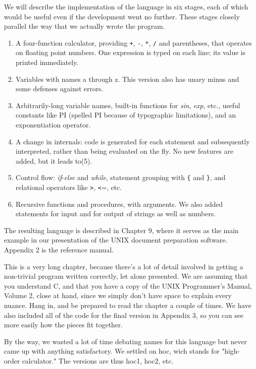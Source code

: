 We will describe the implementation of the language in six stages, each of which
would be useful even if the development went no further. These stages closely
parallel the way that we actually wrote the program.
\begin{enumerate}
\item A four-function calculator, providing \verb=+=, \verb=-=, \verb=*=,
  \verb=/= and parentheses, that operates on floating point numbers. One
  expression is typed on each line; its value is printed immediately.
\item Variables with names a through z. This version also has unary minus and
  some defenses against errors.
\item Arbitrarily-long variable names, built-in functions for \textit{sin},
  \textit{exp}, etc., useful constants like \textsc{PI} (spelled PI because of
  typographic limitations), and an exponentiation operator.
\item A change in internals: code is generated for each statement and
  subsequently interpreted, rather than being evaluated on the fly. No new
  features are added, but it leads to(5).
\item Control flow: \textit{if}-\textit{else} and \textit{while}, statement
  grouping with \verb={= and \verb=}=, and relational operators like \verb=>=,
  \verb=<==, etc.
\item Recursive functions and procedures, with arguments. We also added
  statements for input and for output of strings as well as numbers.
\end{enumerate}
The resulting language is described in Chapter 9, where it serves as the main
example in our presentation of the UNIX document preparation software. Appendix
2 is the reference manual.

This is a very long chapter, because there's a lot of detail involved in getting
a non-trivial program written correctly, let alone presented. We are assuming
that you understand C, and that you have a copy of the UNIX Programmer's Manual,
Volume 2, close at hand, since we simply don't have space to explain every
nuance. Hang in, and be prepared to read the chapter a couple of times. We have
also included all of the code for the final version in Appendix 3, so you can
see more easily how the pieces fit together.

By the way, we wasted a lot of time debating names for this language but never
came up with anything satisfactory. We settled on hoc, wich stands for
"high-order calculator." The versions are thus hoc1, hoc2, etc.


